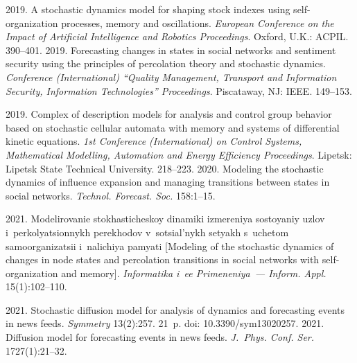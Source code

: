\begin{multicols}{2}
{{\begin{thebibliography}{99}
 2019. A stochastic dynamics model for shaping stock indexes using 
self-organization processes, memory and oscillations. \textit{European Conference on the Impact of Artificial 
Intelligence and Robotics Proceedings}. Oxford, U.K.: ACPIL. 390--401.
 2019. Forecasting changes in states in social networks and 
sentiment security using the principles of percolation theory and stochastic dynamics. \textit{Conference (International) 
``Quality Management, Transport and Information Security, Information Technologies'' Proceedings}. 
Piscataway, NJ: IEEE. 149--153. 


 2019. Complex of description models for analysis and control group behavior 
based on stochastic cellular automata with memory and systems of differential kinetic equations. \textit{1st  Conference 
(International)  on Control Systems, Mathematical Modelling, Automation and Energy Efficiency Proceedings}. 
Lipetsk: Lipetsk State Technical 
University.  218--223.
 2020. Modeling the stochastic dynamics of influence 
expansion and managing transitions between states in social networks. \textit{Technol. Forecast. Soc.} 
158:1--15.

 2021. 
Modelirovanie stokhasticheskoy dinamiki izmereniya sostoyaniy uzlov i~perkolyatsionnykh
pe\-re\-kho\-dov v~so\-tsi\-al'\-nykh se\-tyakh s~uche\-tom sa\-mo\-or\-ga\-ni\-za\-tsii i~na\-li\-chiya pa\-mya\-ti
[Modeling of the stochastic dynamics of changes 
in node states and percolation transitions in social networks with self-organization and memory]. \textit{Informatika i~ee 
Primeneniya~--- Inform. Appl.} 15(1):102--110.
{

}

 2021. Stochastic diffusion model for analysis of dynamics and 
forecasting events in news feeds. \textit{Symmetry} 13(2):257. 21~p. doi: 10.3390/sym13020257.
 2021. Diffusion model for forecasting events in news feeds. 
\textit{J.~Phys. Conf. Ser.} 1727(1):21--32.
\end{thebibliography}

 }
 }

\end{multicols}

